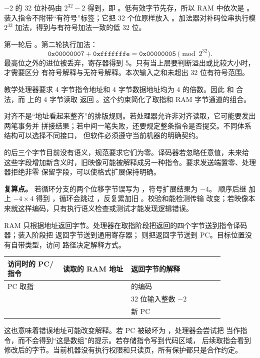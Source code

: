\(-2\) 的 32 位补码由 \(2^{32}-2\) 得到，即 。低有效字节先存，所以
RAM 中依次是 。装入指令不附带“有符号”标签；它把 32 个位原样放入
。加法器对补码位串执行模 \(2^{32}\) 加法，得到与有符号加法一致的低 32 位。

第一轮后 。第二轮执行加法：
\[
\texttt{0x00000007}+\texttt{0xfffffffe}
=\texttt{0x00000005}\pmod{2^{32}}.
\]
最高位之外的进位被丢弃，寄存器得到 5。只有当上层要判断溢出或比较大小时，才需要区分
有符号解释与无符号解释。本次输入之和未超出 32 位有符号范围。


教学处理器要求 4 字节指令地址和 4 字节数据地址均为 4 的倍数。因此
 和  合法，而  上的 4 字节读取
返回 。这个约束简化了取指和 RAM 字节通道的组合。

对齐不是“地址看起来整齐”的排版规则。若处理器允许非对齐读取，它可能要发出两笔事务并
拼接结果；若中间一笔失败，还要规定整条指令是否提交。不同体系结构可以选择不同接口，
但软件必须遵守当前机器的明确契约。


 的后三个字节目前没有语义，规范要求它们为零。译码器若忽略任意值，未来给
这些字段增加新含义时，旧映像可能被解释成另一种指令。要求发送端置零、处理器拒绝非零
保留字段，可以使格式扩展保持明确。

\begin{problemframe}
\textbf{复算点。} 若循环分支的两个位移字节误写为 ，符号扩展结果为 \(-4\)。
顺序后继  加上 \(-4\times4\) 得到
，循环会跳过 ，反复累加旧 。校验和能检测传输
改变；若映像本来就这样编码，只有执行语义检查或测试才能发现逻辑错误。
\end{problemframe}


RAM 只根据地址返回字节。处理器在取指阶段把返回的四个字节送到指令译码器；装入阶段把
返回字节送到通用寄存器； 则把返回字节送到 PC。目标位置没有自带类型，访问
路径决定解释方式。

\begin{longtable}{|L{0.22\linewidth}|L{0.27\linewidth}|L{0.37\linewidth}|}
\hline
{}
访问时的 PC/指令 & 读取的 RAM 地址 & 返回字节的解释 \\ \hline
PC 取指 &  &  的编码 \\ \hline
{} &  & 32 位输入整数 \(-2\) \\ \hline
{} &  & 新 PC  \\ \hline
\end{longtable}

这也意味着错误地址可能改变解释。若 PC 被破坏为 ，处理器会尝试把
 当作指令，而不会得到“这是数组”的提示。若存储指令写到代码区域，
后续取指会看到修改后的字节。当前机器没有执行权限和只读页，所有保护都只是合作约定。
